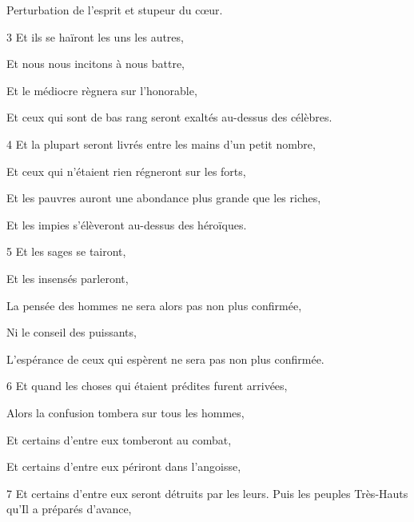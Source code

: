 \par Perturbation de l'esprit et stupeur du cœur.

\par 3 Et ils se haïront les uns les autres,

\par Et nous nous incitons à nous battre,

\par Et le médiocre règnera sur l'honorable,

\par Et ceux qui sont de bas rang seront exaltés au-dessus des célèbres.

\par 4 Et la plupart seront livrés entre les mains d'un petit nombre,

\par Et ceux qui n'étaient rien régneront sur les forts,

\par Et les pauvres auront une abondance plus grande que les riches,

\par Et les impies s'élèveront au-dessus des héroïques.

\par 5 Et les sages se tairont,

\par Et les insensés parleront,

\par La pensée des hommes ne sera alors pas non plus confirmée,

\par Ni le conseil des puissants,

\par L'espérance de ceux qui espèrent ne sera pas non plus confirmée.

\par 6 Et quand les choses qui étaient prédites furent arrivées,

\par Alors la confusion tombera sur tous les hommes,

\par Et certains d'entre eux tomberont au combat,

\par Et certains d'entre eux périront dans l'angoisse,

\par 7 Et certains d'entre eux seront détruits par les leurs. Puis les peuples Très-Hauts qu'Il a préparés d'avance,

